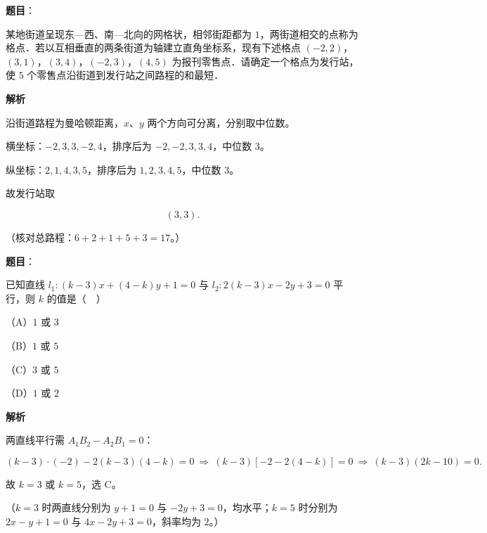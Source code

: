 \begin{answer}

\textbf{题目}：

某地街道呈现东—西、南—北向的网格状，相邻街距都为 $1$，两街道相交的点称为格点．若以互相垂直的两条街道为轴建立直角坐标系，现有下述格点 $(-2,2)$，$(3,1)$，$(3,4)$，$(-2,3)$，$(4,5)$ 为报刊零售点．请确定一个格点\gkblank{}为发行站，使 $5$ 个零售点沿街道到发行站之间路程的和最短．

\textbf{解析}

沿街道路程为曼哈顿距离，$x$、$y$ 两个方向可分离，分别取中位数。

横坐标：$-2,3,3,-2,4$，排序后为 $-2,-2,3,3,4$，中位数 $3$。

纵坐标：$2,1,4,3,5$，排序后为 $1,2,3,4,5$，中位数 $3$。

故发行站取

\nopagebreak[4]
\[(3,3).\]

（核对总路程：$6+2+1+5+3=17$。）


\end{answer}
\begin{answer}

\textbf{题目}：

已知直线 $l_1:(k-3)x+(4-k)y+1=0$ 与 $l_2:2(k-3)x-2y+3=0$ 平行，则 $k$ 的值是（　）

（A）$1$ 或 $3$

（B）$1$ 或 $5$

（C）$3$ 或 $5$

（D）$1$ 或 $2$

\textbf{解析}

两直线平行需 $A_1B_2-A_2B_1=0$：

\nopagebreak[4]
\[(k-3)\cdot(-2)-2(k-3)(4-k)=0
\ \Longrightarrow\ (k-3)\left[-2-2(4-k)\right]=0
\ \Longrightarrow\ (k-3)(2k-10)=0 .\]

故 $k=3$ 或 $k=5$，选 C。

（$k=3$ 时两直线分别为 $y+1=0$ 与 $-2y+3=0$，均水平；$k=5$ 时分别为 $2x-y+1=0$ 与 $4x-2y+3=0$，斜率均为 $2$。）


\end{answer}
